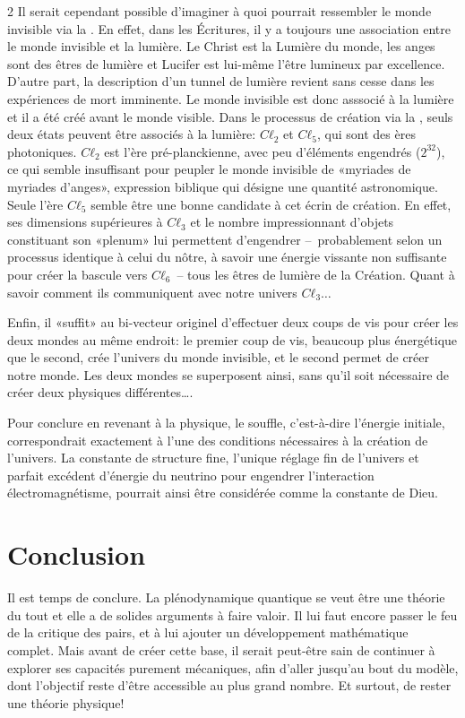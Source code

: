\begin{multicols}{2}
Il serait cependant possible d'imaginer à quoi pourrait ressembler le monde invisible via la \PQ. En effet, dans les Écritures, il y a toujours une association entre le monde invisible et la lumière\cite{aleteia_lumiere_ref}. Le Christ est la Lumière du monde, les anges sont des êtres de lumière et Lucifer est lui-même l'être lumineux par excellence. D'autre part, la description d'un tunnel de lumière revient sans cesse dans les expériences de mort imminente. Le monde invisible est donc asssocié à la lumière et il a été créé avant le monde visible. Dans le processus de création via la \PQ, seuls deux états peuvent être associés à la lumière: $Cℓ_2$ et $Cℓ_5$, qui sont des ères photoniques. $Cℓ_2$ est l'ère pré-planckienne, avec peu d'éléments engendrés ($2^{32}$), ce qui semble insuffisant pour peupler le monde invisible de «myriades de myriades d'anges», expression biblique qui désigne une quantité astronomique. Seule l'ère $Cℓ_5$ semble être une bonne candidate à cet écrin de création. En effet, ses dimensions supérieures à $Cℓ_3$ et le nombre impressionnant d'objets constituant son «plenum» lui permettent d'engendrer --~probablement selon un processus identique à celui du nôtre, à savoir une énergie vissante non suffisante pour créer la bascule vers $Cℓ_6$~-- tous les êtres de lumière de la Création. Quant à savoir comment ils communiquent avec notre univers $Cℓ_3\dots$

Enfin, il «suffit» au bi-vecteur originel d'effectuer deux coups de vis pour créer les deux mondes au même endroit: le premier coup de vis, beaucoup plus énergétique que le second, crée l'univers du monde invisible, et le second permet de créer notre monde. Les deux mondes se superposent ainsi, sans qu'il soit nécessaire de créer deux physiques différentes\dots. 

Pour conclure en revenant à la physique, le souffle, c'est-à-dire l'énergie initiale, correspondrait exactement à l'une des conditions nécessaires à la création de l'univers. La constante de structure fine, l'unique réglage fin de l'univers et parfait excédent d'énergie du neutrino pour engendrer l'interaction électromagnétisme, pourrait ainsi être considérée comme la constante de Dieu.

\section{Conclusion} 

Il est temps de conclure. La plénodynamique quantique se veut 
être une théorie du tout et elle a de solides arguments à faire
valoir. Il lui faut encore passer le feu de la critique des pairs, et
à lui ajouter un développement mathématique complet. Mais avant de créer cette
base, il serait peut-être sain de continuer à explorer ses capacités
purement mécaniques, afin d'aller jusqu'au bout du modèle, dont
l'objectif reste d'être accessible au plus grand nombre. Et surtout,
de rester une théorie physique!


\end{multicols}
